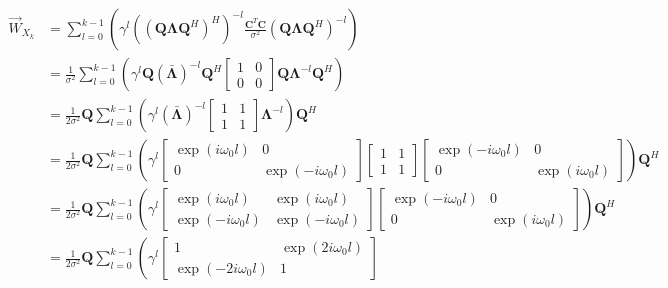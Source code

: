 \documentclass[11pt,a4paper,twoside]{report}
\newcommand{\messF}[3]{\overrightarrow{#1}_{{#2}_{k{#3}}}}
\newcommand{\mat}[1]{\mathbf{#1}}
\begin{document}
\begin{align}
	\nonumber
	\messF{W}{X}{} &= \sum_{l=0}^{k-1}\left(\gamma^{l}\left(\left(\mat{Q\Lambda}\mat{Q}^H\right)^H\right)^{-l}\frac{\mat{C}^T\mat{C}}{\sigma^2}\left(\mat{Q\Lambda}\mat{Q}^H\right)^{-l}\right) \\
	\label{eq: update rule, unitary Q}
	&= \frac{1}{\sigma^2}\sum_{l=0}^{k-1}\left(\gamma^{l}\mat{Q}\left(\bar{\mat{\Lambda}}\right)^{-l}\mat{Q}^H
		\begin{bmatrix}
			1 & 0 \\
			0 & 0
		\end{bmatrix}
		\mat{Q}\mat{\Lambda}^{-l}\mat{Q}^H\right)
	\\
	\nonumber
	&= \frac{1}{2\sigma^2}\mat{Q}\sum_{l=0}^{k-1}\left(\gamma^{l}\left(\bar{\mat{\Lambda}}\right)^{-l}
		\begin{bmatrix}
			1 & 1 \\
			1 & 1
		\end{bmatrix}
		\mat{\Lambda}^{-l}\right)\mat{Q}^H
	\\
	\nonumber
	&= \frac{1}{2\sigma^2}\mat{Q}\sum_{l=0}^{k-1}\left(\gamma^{l}
		\begin{bmatrix}
			\exp{(i\omega_0l)} & 0 \\
			0 & \exp{(-i\omega_0l)}
		\end{bmatrix}
		\begin{bmatrix}
			1 & 1 \\
			1 & 1
		\end{bmatrix}
		\begin{bmatrix}
			\exp{(-i\omega_0l)} & 0 \\
			0 & \exp{(i\omega_0l)}
		\end{bmatrix}
		\right)\mat{Q}^H
	\\
	\nonumber
	&= \frac{1}{2\sigma^2}\mat{Q}\sum_{l=0}^{k-1}\left( \gamma^{l}
		\begin{bmatrix}
			\exp{(i\omega_0l)} & \exp{(i\omega_0l)} \\
			\exp{(-i\omega_0l)} & \exp{(-i\omega_0l)}
		\end{bmatrix}
		\begin{bmatrix}
			\exp{(-i\omega_0l)} & 0 \\
			0 & \exp{(i\omega_0l)}
		\end{bmatrix}
		\right)\mat{Q}^H
	\\
	\nonumber
	&= \frac{1}{2\sigma^2}\mat{Q}\sum_{l=0}^{k-1}\left(\gamma^{l}
		\begin{bmatrix}
			1 & \exp{(2i\omega_0l)} \\
			\exp{(-2i\omega_0l)} & 1

\end{bmatrix}
\end{align}
\end{document}

